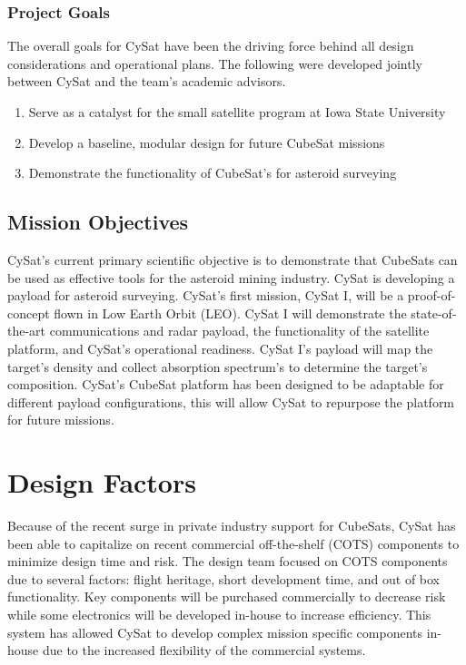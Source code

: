 \documentclass[nocover]            %
{CSLI}                       %
\begin{document}
\subsubsection{Project Goals}
The overall goals for CySat have been the driving force behind all design considerations and operational plans. The following were developed jointly between CySat and the team's academic advisors.
\begin{enumerate}
\item Serve as a catalyst for the small satellite program at Iowa State University
\item Develop a baseline, modular design for future CubeSat missions
\item Demonstrate the functionality of CubeSat's for asteroid surveying
\end{enumerate}

\subsection{Mission Objectives}
CySat's current primary scientific objective is to demonstrate that CubeSats can be used as effective tools for the asteroid mining industry. CySat is developing a payload for asteroid surveying. CySat's first mission, CySat I, will be a proof-of-concept flown in Low Earth Orbit (LEO). CySat I will demonstrate the state-of-the-art communications and radar payload, the functionality of the satellite platform, and CySat's operational readiness. CySat I's payload will map the target's density and collect absorption spectrum's to determine the target's composition. CySat's CubeSat platform has been designed to be adaptable for different payload configurations, this will allow CySat to repurpose the platform for future missions.

\section{Design Factors}
Because of the recent surge in private industry support for CubeSats, CySat has been able to capitalize on recent commercial off-the-shelf (COTS) components to minimize design time and risk. The design team focused on COTS components due to several factors: flight heritage, short development time, and out of box functionality. Key components will be purchased commercially to decrease risk while some electronics will be developed in-house to increase efficiency. This system has allowed CySat to develop complex mission specific components in-house due to the increased flexibility of the commercial systems.
\end{document}
